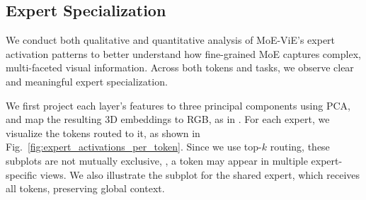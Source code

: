 \documentclass[runningheads]{llncs}
\begin{document}
\subsection{Expert Specialization}
\label{moe_analysis}
We conduct both qualitative and quantitative analysis of MoE-ViE’s expert activation patterns to better understand how fine-grained MoE captures complex, multi-faceted visual information. Across both tokens and tasks, we observe clear and meaningful expert specialization.

We first project each layer’s features to three principal components using PCA, and map the resulting 3D embeddings to RGB, as in \cite{pe,dinov3}. For each expert, we visualize the tokens routed to it, as shown in Fig.~\ref{fig:expert_activations_per_token}. Since we use top-$k$ routing, these subplots are not mutually exclusive, \ie, a token may appear in multiple expert-specific views. We also illustrate the subplot for the shared expert, which receives all tokens, preserving global context. 
\end{document}
